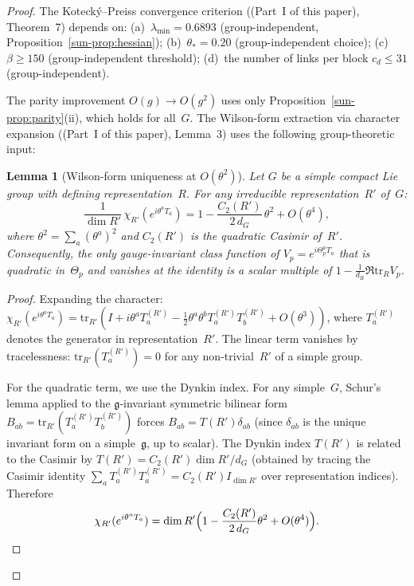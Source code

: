 \documentclass[11pt]{article}
\newtheorem{lemma}[theorem]{Lemma}
\theoremstyle{definition}
\newcommand{\tr}{\mathrm{tr}}
\newcommand{\fg}{\mathfrak{g}}
\begin{document}
\begin{proof}
The Koteck\'y--Preiss convergence criterion
((Part~I of this paper), Theorem~7) depends on:
(a)~$\lambda_{\min}=0.6893$ (group-independent,
Proposition~\ref{sun-prop:hessian});
(b)~$\theta_*=0.20$ (group-independent choice);
(c)~$\beta\ge 150$ (group-independent threshold);
(d)~the number of links per block $c_d\le 31$
(group-independent).

The parity improvement $O(g)\to O(g^2)$ uses only
Proposition~\ref{sun-prop:parity}(ii), which holds for
all~$G$.  The Wilson-form extraction via character
expansion ((Part~I of this paper), Lemma~3) uses the
following group-theoretic input:

\begin{lemma}[Wilson-form uniqueness at $O(\theta^2)$]
\label{sun-lem:wilson-form}
Let $G$ be a simple compact Lie group with defining
representation~$R$.  For any irreducible
representation~$R'$ of~$G$:
\begin{equation}\label{sun-eq:char-expand}
\frac{1}{\dim R'}\,\chi_{R'}(e^{i\theta^a T_a})
=1-\frac{C_2(R')}{2\,d_G}\,\theta^2+O(\theta^4),
\end{equation}
where $\theta^2=\sum_a(\theta^a)^2$ and $C_2(R')$ is
the quadratic Casimir of~$R'$.  Consequently, the only
gauge-invariant class function of $V_p=e^{i\Theta_p^a T_a}$
that is quadratic in~$\Theta_p$ and vanishes at the
identity is a scalar multiple of
$1-\frac{1}{d_R}\Re\tr_R V_p$.
\end{lemma}

\begin{proof}
Expanding the character:
$\chi_{R'}(e^{i\theta^a T_a})
=\tr_{R'}(I+i\theta^a T_a^{(R')}
-\frac{1}{2}\theta^a\theta^b T_a^{(R')}T_b^{(R')}
+O(\theta^3))$,
where $T_a^{(R')}$ denotes the generator in
representation~$R'$.  The linear term vanishes by
tracelessness: $\tr_{R'}(T_a^{(R')})=0$ for any
non-trivial~$R'$ of a simple group.

For the quadratic term, we use the Dynkin index.
For any simple~$G$, Schur's lemma applied to the
$\fg$-invariant symmetric bilinear form
$B_{ab}=\tr_{R'}(T_a^{(R')}T_b^{(R')})$ forces
$B_{ab}=T(R')\delta_{ab}$
(since $\delta_{ab}$ is the unique invariant form
on a simple~$\fg$, up to scalar).
The Dynkin index $T(R')$ is related to the Casimir by
$T(R')=C_2(R')\dim R'/d_G$
(obtained by tracing the Casimir identity
$\sum_a T_a^{(R')}T_a^{(R')}=C_2(R')I_{\dim R'}$
over representation indices).
Therefore
\begin{equation}
\chi_{R'}(e^{i\theta^a T_a})
=\dim R'\Bigl(1-\frac{C_2(R')}{2\,d_G}\theta^2
+O(\theta^4)\Bigr).
\end{equation}


\end{proof}
\end{proof}
\end{document}

